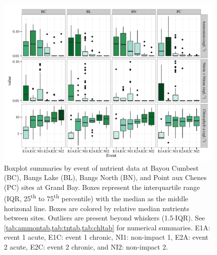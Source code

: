 \documentclass[letterpaper,12pt]{article}\usepackage[]{graphicx}\usepackage[]{color}
\makeatletter
\def\maxwidth{ %
  \ifdim\Gin@nat@width>\linewidth
    \linewidth
  \else
    \Gin@nat@width
  \fi
}
\newcommand{\beginsupplement}{%
        \setcounter{table}{0}
        \renewcommand{\thetable}{S\arabic{table}}%
        \setcounter{figure}{0}
        \renewcommand{\thefigure}{S\arabic{figure}}%
     }
\makeatother
\begin{document}
\clearpage

\beginsupplement

\begin{figure}[!ht]

{\centering \includegraphics[width=\maxwidth]{figs/boxplt_all-1} 

}

\caption{Boxplot summaries by event of nutrient data at Bayou Cumbest (BC), Bangs Lake (BL), Bangs North (BN), and Point aux Chenes (PC) sites at Grand Bay.  Boxes represent the interquartile range (IQR, 25\textsuperscript{th} to 75\textsuperscript{th} percentile) with the median as the middle horizonal line.  Boxes are colored by relative median nutrients between sites.  Outliers are present beyond whiskers (1.5$\cdot$IQR). See \cref{tab:ammontab,tab:tntab,tab:chltab} for numerical summaries.  E1A: event 1 acute, E1C: event 1 chronic, NI1: non-impact 1, E2A: event 2 acute, E2C: event 2 chronic, and NI2: non-impact 2.}\label{fig:boxplt_all}
\end{figure}


\clearpage
\end{document}
